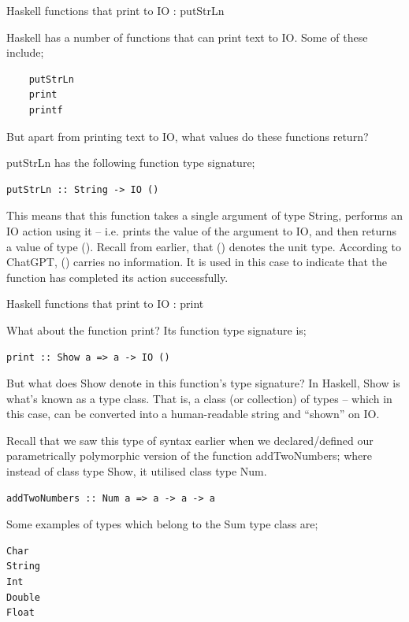 
\begin{frame}[t, fragile]{Haskell functions that print to IO : putStrLn}

Haskell has a number of functions that can print text to IO. Some of these include;

\begin{verbatim}
    putStrLn
    print
    printf
\end{verbatim}

But apart from printing text to IO, what values do these functions return?

putStrLn has the following function type signature;

\begin{verbatim}
putStrLn :: String -> IO ()
\end{verbatim}

This means that this function takes a single argument of type String, performs an IO action using it -- i.e. prints the
value of the argument to IO, and then returns a value of type (). Recall from earlier, that () denotes the unit type.
According to ChatGPT, () carries no information. It is used in this case to indicate that the function has completed
its action successfully.

\end{frame}



\begin{frame}[t, fragile]{Haskell functions that print to IO : print}

What about the function print? Its function type signature is;

\begin{verbatim}
print :: Show a => a -> IO ()
\end{verbatim}

But what does Show denote in this function's type signature? In Haskell, Show is what's known as a type class. That is,
a class (or collection) of types -- which in this case, can be converted into a human-readable string and ``shown'' on
IO.

Recall that we saw this type of syntax earlier when we declared/defined our parametrically polymorphic version of the
function addTwoNumbers; where instead of class type Show, it utilised class type Num.

\begin{verbatim}
addTwoNumbers :: Num a => a -> a -> a
\end{verbatim}

Some examples of types which belong to the Sum type class are;

\begin{verbatim}
Char
String
Int
Double
Float
\end{verbatim}

\end{frame}


